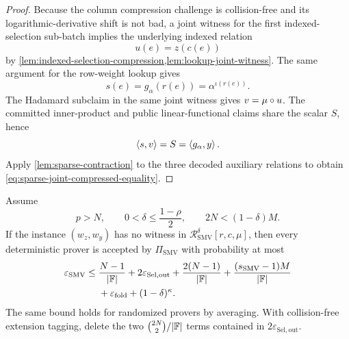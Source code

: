 \begin{proof}
Because the column compression challenge is collision-free and its logarithmic-derivative shift is not bad, a joint witness for the first indexed-selection sub-batch implies the underlying indexed relation
\[
  u(e)=z(c(e))
\]
by \cref{lem:indexed-selection-compression,lem:lookup-joint-witness}.  The same argument for the row-weight lookup gives
\[
  s(e)=g_\alpha(r(e))=\alpha^{\iota(r(e))}.
\]
The Hadamard subclaim in the same joint witness gives $v=\mu\circ u$.  The committed inner-product and public linear-functional claims share the scalar $S$, hence
\[
  \left\langle s,v\right\rangle=S=\left\langle g_\alpha,y\right\rangle.
\]
Apply \cref{lem:sparse-contraction} to the three decoded auxiliary relations to obtain \eqref{eq:sparse-joint-compressed-equality}.
\end{proof}

\begin{theorem}
\label{thm:sparse-matvec-soundness}
Assume
\begin{equation}
  p>N,
  \qquad
  0<\delta\le\frac{1-\rho}{2},
  \qquad
  2N<(1-\delta)M.
  \label{eq:sparse-matvec-parameters}
\end{equation}
If the instance $(w_z,w_y)$ has no witness in $\mathcal R^{\delta}_{\mathrm{SMV}}[r,c,\mu]$, then every deterministic prover is accepted by $\Pi_{\mathrm{SMV}}$ with probability at most
\begin{equation}
\begin{split}
  \varepsilon_{\mathrm{SMV}}
  \le{}&
  \frac{N-1}{|\mathbb{F}|}
  +2\varepsilon_{\mathrm{Sel,out}}
  +\frac{2(N-1)}{|\mathbb{F}|}
  +\frac{(s_{\mathrm{SMV}}-1)M}{|\mathbb{F}|}
  \\
  &+\varepsilon_{\mathrm{fold}}
  +(1-\delta)^\kappa.
\end{split}
\label{eq:sparse-matvec-soundness-bound}
\end{equation}
The same bound holds for randomized provers by averaging.  With collision-free extension tagging, delete the two $\binom{2N}{2}/|\mathbb{F}|$ terms contained in $2\varepsilon_{\mathrm{Sel,out}}$.
\end{theorem}

